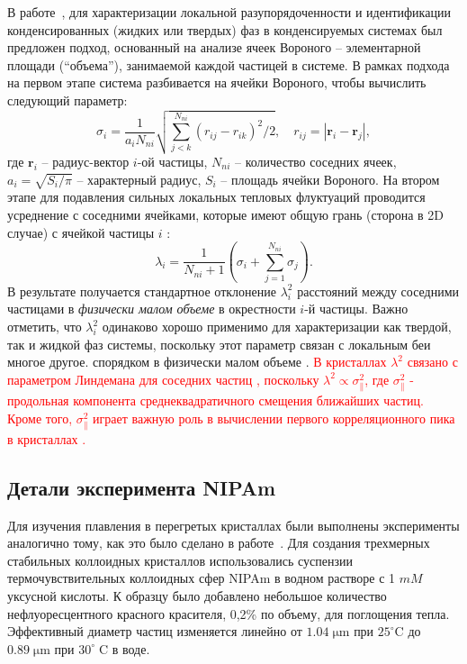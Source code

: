 В работе~\cite{10.1021/acs.jpcc.7b09317}, для характеризации локальной разупорядоченности и идентификации конденсированных (жидких или твердых) фаз в конденсируемых системах был предложен подход, основанный на анализе ячеек Вороного -- элементарной площади (``объема''), занимаемой каждой частицей в системе.
В рамках подхода на первом этапе система разбивается на ячейки Вороного, чтобы вычислить следующий параметр:
\begin{equation}
\label{SSMF-eq1}
\sigma_{i} =\frac{1}{a_i N_{ni}}\sqrt{\sum_{j<k}^{N_{ni}}{(r_{ij}-r_{ik})^2}/2}, \quad r_{ij}=|\mathbf{r}_i-\mathbf{r}_j|,
\end{equation}
где $\mathbf{r}_i$ -- радиус-вектор $i$-ой частицы, $N_{ni}$ -- количество соседних ячеек, $a_i = \sqrt{S_i/\pi}$ -- характерный радиус, $S_i$ -- площадь ячейки Вороного.
На втором этапе для подавления сильных локальных тепловых флуктуаций проводится усреднение с соседними ячейками, которые имеют общую грань (сторона в 2D случае) с ячейкой частицы $i$ \cite{10.1021/acs.jpcc.7b09317}:
\begin{equation}
\label{SSMF-eq2}
\lambda_{i} = \frac{1}{N_{ni}+1}\left(\sigma_{i}+\sum_{j=1}^{N_{ni}}{\sigma_{j}}\right).
\end{equation}
В результате получается стандартное отклонение $\lambda_i^2$ расстояний между соседними частицами в \emph{физически малом объеме} в окрестности $i$-й частицы.
Важно отметить, что $\lambda_i^2$ одинаково хорошо применимо для характеризации как твердой, так и жидкой фаз системы, поскольку этот параметр связан с локальным беи многое другое. спорядком в физически малом объеме \cite{10.1021/acs.jpcc.7b09317}.
\textcolor{red}{В кристаллах $\lambda^2$ связано с параметром Линдемана для соседних частиц \cite{10.1016/0375-9601(85)90617-6}, поскольку $\lambda^2 \propto \sigma_\|^2$, где $\sigma_\|^2$ - продольная компонента среднеквадратичного смещения ближайших частиц.
Кроме того, $\sigma_\|^2$ играет важную роль в вычислении первого корреляционного пика в кристаллах \cite{10.1063/1.4869863, 10.1063/1.4926945, 10.1088/0953-8984/28/23/235401, 10.1039/c7sm02429k, 10.1063/1.5116176}.}

\subsection{Детали эксперимента NIPAm}
\label{SSMF-AppB}

Для изучения плавления в перегретых кристаллах были выполнены эксперименты аналогично тому, как это было сделано в работе~\cite{10.1126/science.1224763}.
Для создания трехмерных стабильных коллоидных кристаллов использовались суспензии термочувствительных коллоидных сфер NIPAm в водном растворе с 1 $mM$ уксусной кислоты.
К образцу было добавлено небольшое количество нефлуоресцентного красного красителя, 0,2\% по объему, для поглощения тепла.
Эффективный диаметр частиц изменяется линейно от
$1.04 \; \mathrm{\mu m} $ при $ 25 ^ {\circ} \mathrm{C}$ до $0.89 \; \mathrm{\mu m}$ при $30 ^ {\circ}\; \mathrm{C}$ в воде.

